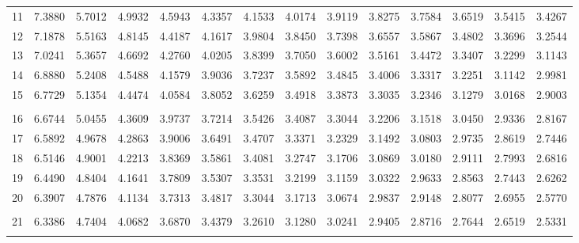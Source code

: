 {\begin{tabular}{l|lllllllllllll}
\\ 
 11 & 7.3880 & 5.7012 & 4.9932 & 4.5943 & 4.3357 & 4.1533 & 4.0174 & 3.9119 & 3.8275 & 3.7584 & 3.6519 & 3.5415 & 3.4267 \\[5pt] \arrayrulecolor{light-gray}\hline\arrayrulecolor{black}  
 12 & 7.1878 & 5.5163 & 4.8145 & 4.4187 & 4.1617 & 3.9804 & 3.8450 & 3.7398 & 3.6557 & 3.5867 & 3.4802 & 3.3696 & 3.2544 \\[5pt] \arrayrulecolor{light-gray}\hline\arrayrulecolor{black}  
 13 & 7.0241 & 5.3657 & 4.6692 & 4.2760 & 4.0205 & 3.8399 & 3.7050 & 3.6002 & 3.5161 & 3.4472 & 3.3407 & 3.2299 & 3.1143 \\[5pt] \arrayrulecolor{light-gray}\hline\arrayrulecolor{black}  
 14 & 6.8880 & 5.2408 & 4.5488 & 4.1579 & 3.9036 & 3.7237 & 3.5892 & 3.4845 & 3.4006 & 3.3317 & 3.2251 & 3.1142 & 2.9981 \\[5pt] \arrayrulecolor{light-gray}\hline\arrayrulecolor{black}  
 15 & 6.7729 & 5.1354 & 4.4474 & 4.0584 & 3.8052 & 3.6259 & 3.4918 & 3.3873 & 3.3035 & 3.2346 & 3.1279 & 3.0168 & 2.9003 \\[5pt] \arrayrulecolor{light-gray}\hline\arrayrulecolor{black}  
\\ 
 16 & 6.6744 & 5.0455 & 4.3609 & 3.9737 & 3.7214 & 3.5426 & 3.4087 & 3.3044 & 3.2206 & 3.1518 & 3.0450 & 2.9336 & 2.8167 \\[5pt] \arrayrulecolor{light-gray}\hline\arrayrulecolor{black}  
 17 & 6.5892 & 4.9678 & 4.2863 & 3.9006 & 3.6491 & 3.4707 & 3.3371 & 3.2329 & 3.1492 & 3.0803 & 2.9735 & 2.8619 & 2.7446 \\[5pt] \arrayrulecolor{light-gray}\hline\arrayrulecolor{black}  
 18 & 6.5146 & 4.9001 & 4.2213 & 3.8369 & 3.5861 & 3.4081 & 3.2747 & 3.1706 & 3.0869 & 3.0180 & 2.9111 & 2.7993 & 2.6816 \\[5pt] \arrayrulecolor{light-gray}\hline\arrayrulecolor{black}  
 19 & 6.4490 & 4.8404 & 4.1641 & 3.7809 & 3.5307 & 3.3531 & 3.2199 & 3.1159 & 3.0322 & 2.9633 & 2.8563 & 2.7443 & 2.6262 \\[5pt] \arrayrulecolor{light-gray}\hline\arrayrulecolor{black}  
 20 & 6.3907 & 4.7876 & 4.1134 & 3.7313 & 3.4817 & 3.3044 & 3.1713 & 3.0674 & 2.9837 & 2.9148 & 2.8077 & 2.6955 & 2.5770 \\[5pt] \arrayrulecolor{light-gray}\hline\arrayrulecolor{black}  
\\ 
 21 & 6.3386 & 4.7404 & 4.0682 & 3.6870 & 3.4379 & 3.2610 & 3.1280 & 3.0241 & 2.9405 & 2.8716 & 2.7644 & 2.6519 & 2.5331 \\[5pt] \arrayrulecolor{light-gray}\hline\arrayrulecolor{black}  

\end{tabular}}
